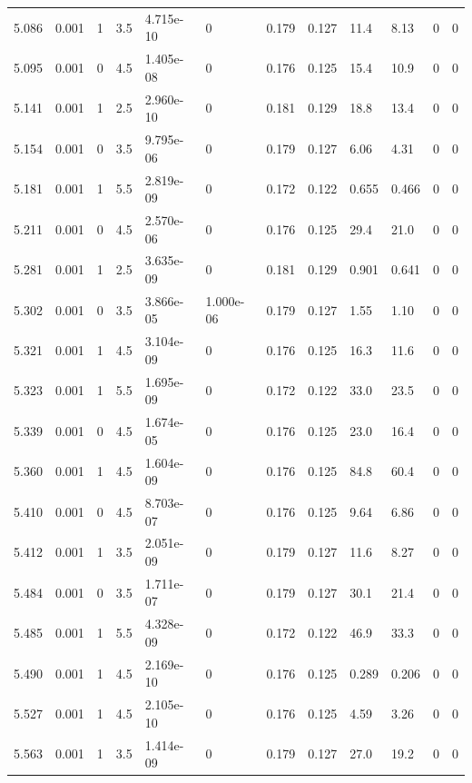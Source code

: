 \documentclass[preview]{standalone}
\begin{document}
{{{{{\begin{tabular}{L{1.2cm}C{1.2cm} C{0.3cm}C{0.5cm} C{1.4cm}C{1.4cm} C{1.4cm}C{1.4cm} C{1.6cm}C{1.6cm} C{1.6cm}C{1.6cm}}
  5.086  &  0.001  & 1     & 3.5 &  4.715e-10  & 0  &  0.179&   0.127& 11.4 & 8.13   &  0 & 0  \\ 
  5.095  &  0.001  & 0     & 4.5 &  1.405e-08  & 0  &  0.176&   0.125& 15.4 & 10.9   &  0 & 0  \\ 
  5.141  &  0.001  & 1     & 2.5 &  2.960e-10  & 0  &  0.181&   0.129& 18.8 & 13.4   &  0 & 0  \\ 
  5.154  &  0.001  & 0     & 3.5 &  9.795e-06  & 0  &  0.179&   0.127& 6.06 & 4.31   &  0 & 0  \\ 
  5.181  &  0.001  & 1     & 5.5 &  2.819e-09  & 0  &  0.172&   0.122& 0.655 & 0.466   &  0 & 0  \\ 
  5.211  &  0.001  & 0     & 4.5 &  2.570e-06  & 0  &  0.176&   0.125& 29.4 & 21.0   &  0 & 0  \\ 
  5.281  &  0.001  & 1     & 2.5 &  3.635e-09  & 0  &  0.181&   0.129& 0.901 & 0.641   &  0 & 0  \\ 
  5.302  &  0.001  & 0     & 3.5 &  3.866e-05  & 1.000e-06  &  0.179&   0.127& 1.55 & 1.10   &  0 & 0  \\ 
  5.321  &  0.001  & 1     & 4.5 &  3.104e-09  & 0  &  0.176&   0.125& 16.3 & 11.6   &  0 & 0  \\ 
  5.323  &  0.001  & 1     & 5.5 &  1.695e-09  & 0  &  0.172&   0.122& 33.0 & 23.5   &  0 & 0  \\ 
  5.339  &  0.001  & 0     & 4.5 &  1.674e-05  & 0  &  0.176&   0.125& 23.0 & 16.4   &  0 & 0  \\ 
  5.360  &  0.001  & 1     & 4.5 &  1.604e-09  & 0  &  0.176&   0.125& 84.8 & 60.4   &  0 & 0  \\ 
  5.410  &  0.001  & 0     & 4.5 &  8.703e-07  & 0  &  0.176&   0.125& 9.64 & 6.86   &  0 & 0  \\ 
  5.412  &  0.001  & 1     & 3.5 &  2.051e-09  & 0  &  0.179&   0.127& 11.6 & 8.27   &  0 & 0  \\ 
  5.484  &  0.001  & 0     & 3.5 &  1.711e-07  & 0  &  0.179&   0.127& 30.1 & 21.4   &  0 & 0  \\ 
  5.485  &  0.001  & 1     & 5.5 &  4.328e-09  & 0  &  0.172&   0.122& 46.9 & 33.3   &  0 & 0  \\ 
  5.490  &  0.001  & 1     & 4.5 &  2.169e-10  & 0  &  0.176&   0.125& 0.289 & 0.206   &  0 & 0  \\ 
  5.527  &  0.001  & 1     & 4.5 &  2.105e-10  & 0  &  0.176&   0.125& 4.59 & 3.26   &  0 & 0  \\ 
  5.563  &  0.001  & 1     & 3.5 &  1.414e-09  & 0  &  0.179&   0.127& 27.0 & 19.2   &  0 & 0  \\ 

\end{tabular}}}}}}
\end{document}
